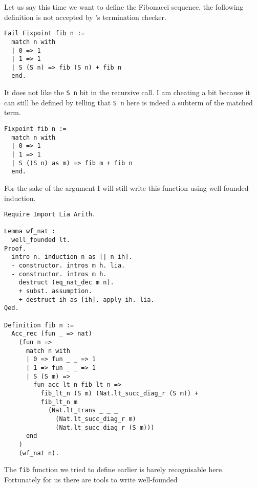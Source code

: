 Let us say this time we want to define the Fibonacci sequence, the following
definition is not accepted by \Coq's termination checker.
\begin{verbatim}
Fail Fixpoint fib n :=
  match n with
  | 0 => 1
  | 1 => 1
  | S (S n) => fib (S n) + fib n
  end.
\end{verbatim}
It does not like the \texttt{S n} bit in the recursive call.
I am cheating a bit because it can still be defined by telling \Coq that
\texttt{S n} here is indeed a subterm of the matched term.
\begin{verbatim}
Fixpoint fib n :=
  match n with
  | 0 => 1
  | 1 => 1
  | S ((S n) as m) => fib m + fib n
  end.
\end{verbatim}
For the sake of the argument I will still write this function using well-founded
induction.
\begin{verbatim}
Require Import Lia Arith.

Lemma wf_nat :
  well_founded lt.
Proof.
  intro n. induction n as [| n ih].
  - constructor. intros m h. lia.
  - constructor. intros m h.
    destruct (eq_nat_dec m n).
    + subst. assumption.
    + destruct ih as [ih]. apply ih. lia.
Qed.

Definition fib n :=
  Acc_rec (fun _ => nat)
    (fun n =>
      match n with
      | 0 => fun _ _ => 1
      | 1 => fun _ _ => 1
      | S (S m) =>
        fun acc_lt_n fib_lt_n =>
          fib_lt_n (S m) (Nat.lt_succ_diag_r (S m)) +
          fib_lt_n m
            (Nat.lt_trans _ _ _
              (Nat.lt_succ_diag_r m)
              (Nat.lt_succ_diag_r (S m)))
      end
    )
    (wf_nat n).
\end{verbatim}
The \texttt{fib} function we tried to define earlier is barely
recognisable here. Fortunately for us there are tools to write well-founded
